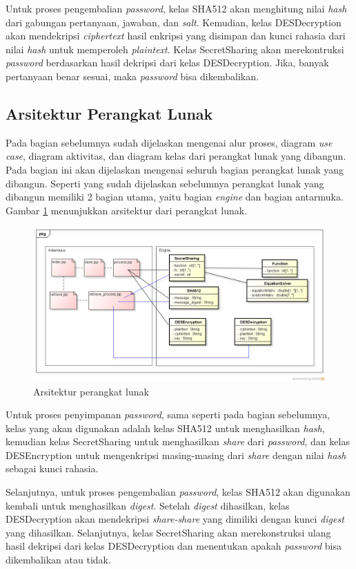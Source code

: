 Untuk proses pengembalian \textit{password}, kelas SHA512 akan menghitung nilai \textit{hash} dari gabungan pertanyaan, jawaban, dan \textit{salt}. Kemudian, kelas DESDecryption akan mendekripsi \textit{ciphertext} hasil enkripsi yang disimpan dan kunci rahasia dari nilai \textit{hash} untuk memperoleh \textit{plaintext}. Kelas SecretSharing akan merekontruksi \textit{password} berdasarkan hasil dekripsi dari kelas DESDecryption. Jika, banyak pertanyaan benar sesuai, maka \textit{password} bisa dikembalikan.

\subsection{Arsitektur Perangkat Lunak}

Pada bagian sebelumnya sudah dijelaskan mengenai alur proses, diagram \textit{use case}, diagram aktivitas, dan diagram kelas dari perangkat lunak yang dibangun. Pada bagian ini akan dijelaskan mengenai seluruh bagian perangkat lunak yang dibangun. Seperti yang sudah dijelaskan sebelumnya perangkat lunak yang dibangun memiliki 2 bagian utama, yaitu bagian \textit{engine} dan bagian antarmuka. Gambar \ref{fig:arsitektur-perangkat-lunak} menunjukkan arsitektur dari perangkat lunak.

\begin{figure}[H]
	\centerline{\includegraphics[scale=0.5]{Gambar/arsitektur}}
	\caption{Arsitektur perangkat lunak}\label{fig:arsitektur-perangkat-lunak}
\end{figure}

Untuk proses penyimpanan \textit{password}, sama seperti pada bagian sebelumnya, kelas yang akan digunakan adalah kelas SHA512 untuk menghasilkan \textit{hash}, kemudian kelas SecretSharing untuk menghasilkan \textit{share} dari \textit{password}, dan kelas DESEncryption untuk mengenkripsi masing-masing dari \textit{share} dengan nilai \textit{hash} sebagai kunci rahasia.

Selanjutnya, untuk proses pengembalian \textit{password}, kelas SHA512 akan digunakan kembali untuk menghasilkan \textit{digest}. Setelah \textit{digest} dihasilkan, kelas DESDecryption akan mendekripsi \textit{share-share} yang dimiliki dengan kunci \textit{digest} yang dihasilkan. Selanjutnya, kelas SecretSharing akan merekonstruksi ulang hasil dekripsi dari kelas DESDecryption dan menentukan apakah \textit{password} bisa dikembalikan atau tidak.